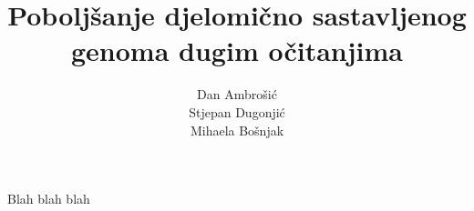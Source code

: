 \documentclass[lmodern, utf8, zavrsni, numeric]{fer}
\begin{document}
\title{ Poboljšanje djelomično sastavljenog genoma dugim očitanjima}

\author{Dan Ambrošić \\Stjepan Dugonjić \\Mihaela Bošnjak}

\maketitle


\tableofcontents









\begin{sazetak}
Blah blah blah

\end{sazetak}
\end{document}
